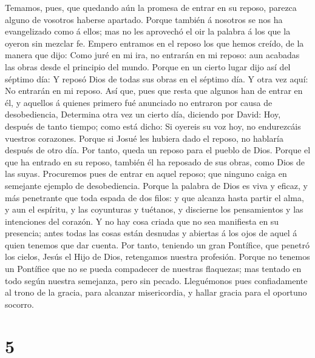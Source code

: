  Temamos, pues, que quedando aún la promesa de entrar en
su reposo, parezca alguno de vosotros haberse apartado. 
Porque también á nosotros se nos ha evangelizado como á ellos; mas no
les aprovechó el oir la palabra á los que la oyeron sin mezclar fe.
 Empero entramos en el reposo los que hemos creído, de la
manera que dijo: Como juré en mi ira, no entrarán en mi reposo: aun
acabadas las obras desde el principio del mundo.  Porque
en un cierto lugar dijo así del séptimo día: Y reposó Dios de todas sus
obras en el séptimo día.  Y otra vez aquí: No entrarán en
mi reposo.  Así que, pues que resta que algunos han de
entrar en él, y aquellos á quienes primero fué anunciado no entraron por
causa de desobediencia,  Determina otra vez un cierto día,
diciendo por David: Hoy, después de tanto tiempo; como está dicho: Si
oyereis su voz hoy, no endurezcáis vuestros corazones. 
Porque si Josué les hubiera dado el reposo, no hablaría después de otro
día.  Por tanto, queda un reposo para el pueblo de Dios.
 Porque el que ha entrado en su reposo, también él ha
reposado de sus obras, como Dios de las suyas. 
Procuremos pues de entrar en aquel reposo; que ninguno caiga en
semejante ejemplo de desobediencia.  Porque la palabra de
Dios es viva y eficaz, y más penetrante que toda espada de dos filos: y
que alcanza hasta partir el alma, y aun el espíritu, y las coyunturas y
tuétanos, y discierne los pensamientos y las intenciones del corazón.
 Y no hay cosa criada que no sea manifiesta en su
presencia; antes todas las cosas están desnudas y abiertas á los ojos de
aquel á quien tenemos que dar cuenta.  Por tanto,
teniendo un gran Pontífice, que penetró los cielos, Jesús el Hijo de
Dios, retengamos nuestra profesión.  Porque no tenemos un
Pontífice que no se pueda compadecer de nuestras flaquezas; mas tentado
en todo según nuestra semejanza, pero sin pecado. 
Lleguémonos pues confiadamente al trono de la gracia, para alcanzar
misericordia, y hallar gracia para el oportuno socorro.

\hypertarget{section-4}{%
\section{5}\label{section-4}}

